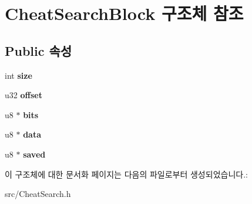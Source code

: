 \hypertarget{struct_cheat_search_block}{}\section{Cheat\+Search\+Block 구조체 참조}
\label{struct_cheat_search_block}
\subsection*{Public 속성}
\begin{DoxyCompactItemize}
\item 
\mbox{\label{struct_cheat_search_block_aaaf9517229363e8807cd511022d90012}} 
int {\bfseries size}
\item 
\mbox{\label{struct_cheat_search_block_a33001049203a8b1b625ccdd29bf57d8f}} 
u32 {\bfseries offset}
\item 
\mbox{\label{struct_cheat_search_block_a59258efebf4223be206ad11d3ca8ebf4}} 
u8 $\ast$ {\bfseries bits}
\item 
\mbox{\label{struct_cheat_search_block_aa3a8235324df132c5fc67c5239748f15}} 
u8 $\ast$ {\bfseries data}
\item 
\mbox{\label{struct_cheat_search_block_af2b921cffd3f8d9420a8b9a3a33752ca}} 
u8 $\ast$ {\bfseries saved}
\end{DoxyCompactItemize}


이 구조체에 대한 문서화 페이지는 다음의 파일로부터 생성되었습니다.\+:\begin{DoxyCompactItemize}
\item 
src/Cheat\+Search.\+h\end{DoxyCompactItemize}
